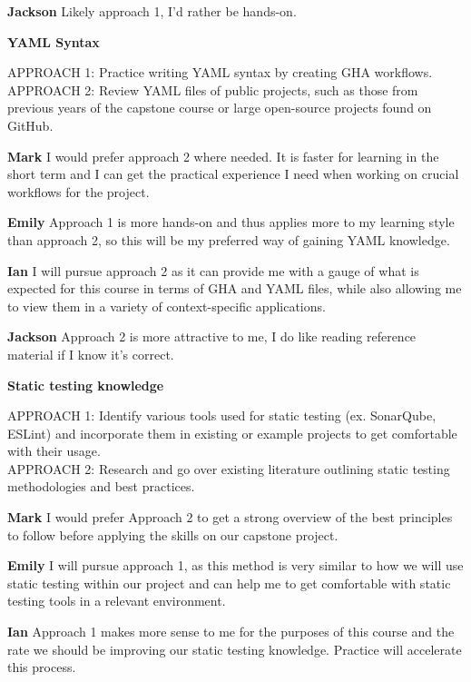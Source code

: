 \documentclass[12pt, titlepage]{article}
\begin{document}
\begin{enumerate}[leftmargin=*]
  \textbf{Jackson} Likely approach 1, I’d rather be hands-on.

  \vspace{10pt}
  \textbf{YAML Syntax}

  APPROACH 1: Practice writing YAML syntax by creating GHA workflows. \\
  APPROACH 2: Review YAML files of public projects, such as those from previous years of the capstone course 
  or large open-source projects found on GitHub.
  
  \textbf{Mark} I would prefer approach 2 where needed. It is faster for learning in the short term and I can 
  get the practical experience I need when working on crucial workflows for the project.

  \textbf{Emily} Approach 1 is more hands-on and thus applies more to my learning style than approach 2, so 
  this will be my preferred way of gaining YAML knowledge.

  \textbf{Ian} I will pursue approach 2 as it can provide me with a gauge of what is expected for this course 
  in terms of GHA and YAML files, while also allowing me 
  to view them in a variety of context-specific applications.

  \textbf{Jackson} Approach 2 is more attractive to me, I do like reading reference material if I know it's correct.

  \vspace{10pt}
  \textbf{Static testing knowledge}

  APPROACH 1: Identify various tools used for static testing (ex. SonarQube, ESLint) and incorporate them in 
  existing or example projects to get comfortable with their usage. \\
  APPROACH 2: Research and go over existing literature outlining static testing methodologies and best practices.

  \textbf{Mark} I would prefer Approach 2 to get a strong overview of the best principles to follow before applying 
  the skills on our capstone project.

  \textbf{Emily} I will pursue approach 1, as this method is very similar to how we will use static testing within our 
  project and can help me to get comfortable with static testing tools in a relevant environment.

  \textbf{Ian} Approach 1 makes more sense to me for the purposes of this course and the rate we should be improving 
  our static testing knowledge. Practice will accelerate this process.


\end{enumerate}
\end{document}
